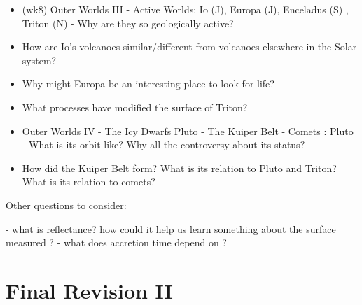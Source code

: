 \documentclass[paper=a4, fontsize=11pt]{scrartcl} %
\numberwithin{equation}{section} %
\begin{document}
\begin{itemize}
\item (wk8)   Outer Worlds III - Active Worlds:  Io (J),  Europa (J),  Enceladus (S) , Triton (N) - Why are they so geologically active?
\item   How are Io's volcanoes similar/different from volcanoes elsewhere in the Solar system?
\item Why might Europa be an interesting place to look for life?
\item What processes have modified the surface of Triton?

\item Outer Worlds IV - The Icy Dwarfs Pluto - The Kuiper Belt - Comets : Pluto -  What is its orbit like?
Why all the controversy about its status?
\item  How did the Kuiper Belt form? What is its relation to Pluto and Triton? What is its relation to comets?

\end{itemize}

Other questions to consider:

- what is reflectance? how could it help us learn something about the surface measured ? 
- what does accretion time depend on ? 




\section{Final Revision II }
\end{document}
